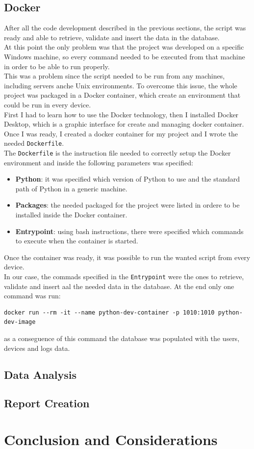 \documentclass[12pt, a4paper, oneside]{article}
\begin{document}
\subsection{Docker}
After all the code development described in the previous sections, the script was ready and able to retrieve, validate and insert the data in the database.\\
At this point the only problem was that the project was developed on a specific Windows machine, so every command needed to be executed from that machine in order to be able to run properly.\\
This was a problem since the script needed to be run from any machines, including servers anche Unix environments. To overcome this issue, the whole project was packaged in a Docker container, which
create an environment that could be run in every device.\\
First I had to learn how to use the Docker technology, then I installed Docker Desktop, which is a graphic interface for create and managing docker container. Once I was ready, I created a docker container for
my project and I wrote the needed \texttt{Dockerfile}. \\
The \texttt{Dockerfile} is the instruction file needed to correctly setup the Docker environment and inside the following parameters was specified:
\begin{itemize}
    \item \textbf{Python}: it was specified which version of Python to use and the standard path of Python in a generic machine.
    \item \textbf{Packages}: the needed packaged for the project were listed in ordere to be installed inside the Docker container.
    \item \textbf{Entrypoint}: using bash instructions, there were specified which commands to execute when the container is started.
\end{itemize}
Once the container was ready, it was possible to run the wanted script from every device.\\
In our case, the commads specified in the \texttt{Entrypoint} were the ones to retrieve, validate and insert aal the needed data in the database. At the end only one command was run:
\begin{center}
\scriptsize
\begin{BVerbatim}
docker run --rm -it --name python-dev-container -p 1010:1010 python-dev-image  
\end{BVerbatim}
\end{center}
as a conseguence of this command the database was populated with the users, devices and logs data.









\subsection{Data Analysis}
\subsection{Report Creation}
\section{Conclusion and Considerations}
\end{document}
